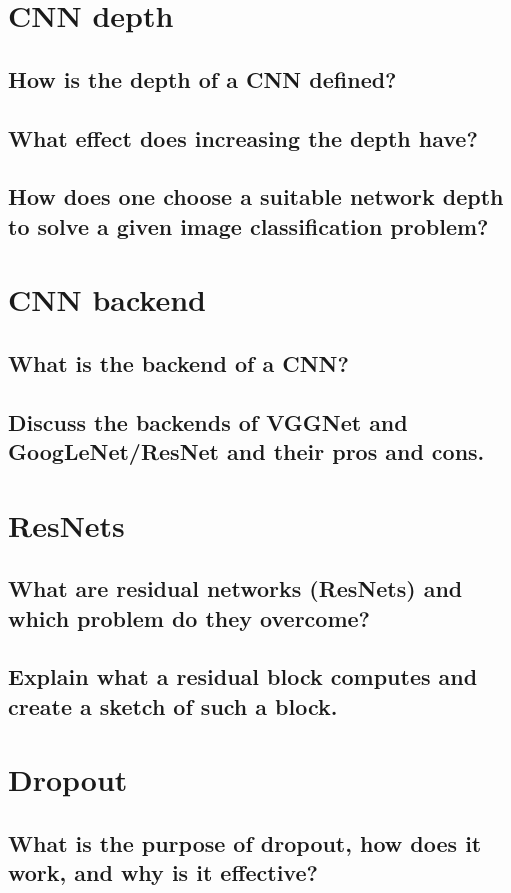 \section{CNN depth}
\subsection{How is the depth of a CNN defined?}
\subsection{What effect does increasing the depth have?}
\subsection{How does one choose a suitable network depth to solve a given image classification problem?}

\section{CNN backend}
\subsection{What is the backend of a CNN?}
\subsection{Discuss the backends of VGGNet and GoogLeNet/ResNet and their pros and cons.}

\section{ResNets}
\subsection{What are residual networks (ResNets) and which problem do they overcome?}
\subsection{Explain what a residual block computes and create a sketch of such a block.}

\section{Dropout}
\subsection{What is the purpose of dropout, how does it work, and why is it effective?}
